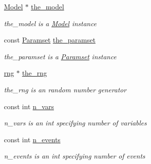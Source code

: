 \begin{DoxyCompactItemize}
\item 
\mbox{\label{class_realization_a47ec1d062b8caee874b08c1a17d6aeeb}} 
\hyperlink{class_model}{Model} $\ast$ \hyperlink{class_realization_a47ec1d062b8caee874b08c1a17d6aeeb}{the\+\_\+model}
\begin{DoxyCompactList}\small\item\em the\+\_\+model is a \hyperlink{class_model}{Model} instance \end{DoxyCompactList}\item 
\mbox{\label{class_realization_a119bb29de88929bc51bc1b329473a94b}} 
const \hyperlink{class_paramset}{Paramset} \hyperlink{class_realization_a119bb29de88929bc51bc1b329473a94b}{the\+\_\+paramset}
\begin{DoxyCompactList}\small\item\em the\+\_\+paramset is a \hyperlink{class_paramset}{Paramset} instance \end{DoxyCompactList}\item 
\mbox{\label{class_realization_ac8d358d929afae90cf5790675b6744f9}} 
\hyperlink{classrng}{rng} $\ast$ \hyperlink{class_realization_ac8d358d929afae90cf5790675b6744f9}{the\+\_\+rng}
\begin{DoxyCompactList}\small\item\em the\+\_\+rng is an random number generator \end{DoxyCompactList}\item 
\mbox{\label{class_realization_ad9951a0829e68e12fcb3817735bb5097}} 
const int \hyperlink{class_realization_ad9951a0829e68e12fcb3817735bb5097}{n\+\_\+vars}
\begin{DoxyCompactList}\small\item\em n\+\_\+vars is an int specifying number of variables \end{DoxyCompactList}\item 
\mbox{\label{class_realization_afb711282bef806fc0020f91252d1df2c}} 
const int \hyperlink{class_realization_afb711282bef806fc0020f91252d1df2c}{n\+\_\+events}
\begin{DoxyCompactList}\small\item\em n\+\_\+events is an int specifying number of events \end{DoxyCompactList}\item 

\end{DoxyCompactItemize}
